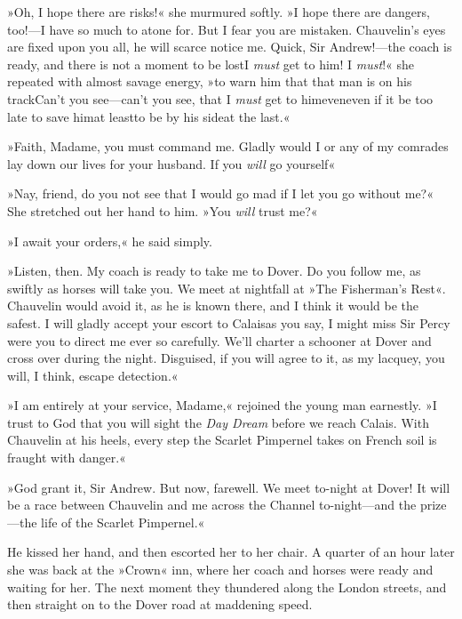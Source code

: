 »Oh, I hope there are risks!« she murmured softly. »I hope there are dangers, too!—I have so much to atone for. But I fear you are mistaken. Chauvelin's eyes are fixed upon you all, he will scarce notice me. Quick, Sir Andrew!—the coach is ready, and there is not a moment to be lost\textellipsis \allowbreak  I \textit{must} get to him! I \textit{must}!« she repeated with almost savage energy, »to warn him that that man is on his track\textellipsis \allowbreak  Can't you see—can't you see, that I \textit{must} get to him\textellipsis \allowbreak  even\textellipsis \allowbreak  even if it be too late to save him\textellipsis \allowbreak  at least\textellipsis \allowbreak  to be by his side\textellipsis \allowbreak  at the last.«

»Faith, Madame, you must command me. Gladly would I or any of my comrades lay down our lives for your husband. If you \textit{will} go yourself\textellipsis«

»Nay, friend, do you not see that I would go mad if I let you go without me?« She stretched out her hand to him. »You \textit{will} trust me?«

»I await your orders,« he said simply.

»Listen, then. My coach is ready to take me to Dover. Do you follow me, as swiftly as horses will take you. We meet at nightfall at »The Fisherman's Rest«. Chauvelin would avoid it, as he is known there, and I think it would be the safest. I will gladly accept your escort to Calais\textellipsis \allowbreak  as you say, I might miss Sir Percy were you to direct me ever so carefully. We'll charter a schooner at Dover and cross over during the night. Disguised, if you will agree to it, as my lacquey, you will, I think, escape detection.«

»I am entirely at your service, Madame,« rejoined the young man earnestly. »I trust to God that you will sight the \textit{Day Dream} before we reach Calais. With Chauvelin at his heels, every step the Scarlet Pimpernel takes on French soil is fraught with danger.«

»God grant it, Sir Andrew. But now, farewell. We meet to-night at Dover! It will be a race between Chauvelin and me across the Channel to-night—and the prize—the life of the Scarlet Pimpernel.«

He kissed her hand, and then escorted her to her chair. A quarter of an hour later she was back at the »Crown« inn, where her coach and horses were ready and waiting for her. The next moment they thundered along the London streets, and then straight on to the Dover road at maddening speed.

